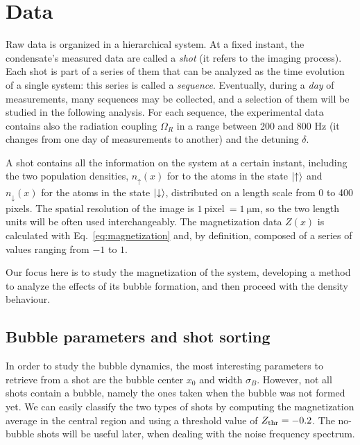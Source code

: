\section{Data}
Raw data is organized in a hierarchical system. At a fixed instant, the condensate's measured data are called a \textit{shot} (it refers to the imaging process). Each shot is part of a series of them that can be analyzed as the time evolution of a single system: this series is called a \textit{sequence}. Eventually, during a \textit{day} of measurements, many sequences may be collected, and a selection of them will be studied in the following analysis. For each sequence, the experimental data contains also the radiation coupling $\Omega_R$ in a range between 200 and 800 \unit{\hertz} (it changes from one day of measurements to another) and the detuning $\delta$.

A shot contains all the information on the system at a certain instant, including the two population densities, $n_\uparrow(x)$ for to the atoms in the state $\ket{\uparrow}$ and $n_\downarrow(x)$ for the atoms in the state $\ket{\downarrow}$, distributed on a length scale from 0 to 400 pixels. The spatial resolution of the image is $1\ \text{pixel}\ = 1\ \unit{\micro\meter}$, so the two length units will be often used interchangeably. The magnetization data $Z(x)$ is calculated with Eq.\ \eqref{eq:magnetization} and, by definition, composed of a series of values ranging from $-1$ to $1$.

Our focus here is to study the magnetization of the system, developing a method to analyze the effects of its bubble formation, and then proceed with the density behaviour.

\subsection{Bubble parameters and shot sorting}
In order to study the bubble dynamics, the most interesting parameters to retrieve from a shot are the bubble center $x_0$ and width $\sigma_B$. However, not all shots contain a bubble, namely the ones taken when the bubble was not formed yet. We can easily classify the two types of shots by computing the magnetization average in the central region and using a threshold value of $Z_{\rm thr} = -0.2$. The no-bubble shots will be useful later, when dealing with the noise frequency spectrum.


